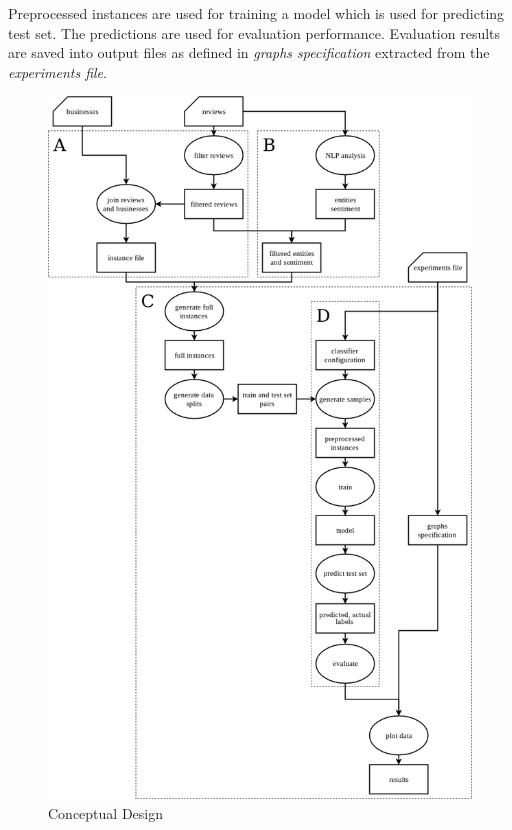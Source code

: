 Preprocessed instances are used for training a model which is used for predicting test set.
The predictions are used for evaluation performance.
Evaluation results are saved into output files as defined in \textit{graphs specification} extracted from
the \textit{experiments file}.


\begin{figure}[ht]
    \centering
	\includegraphics[width=\textwidth]{figures/conceptual_design.png}
	\caption{Conceptual Design}\label{fig:conceptual_design}
\end{figure}






